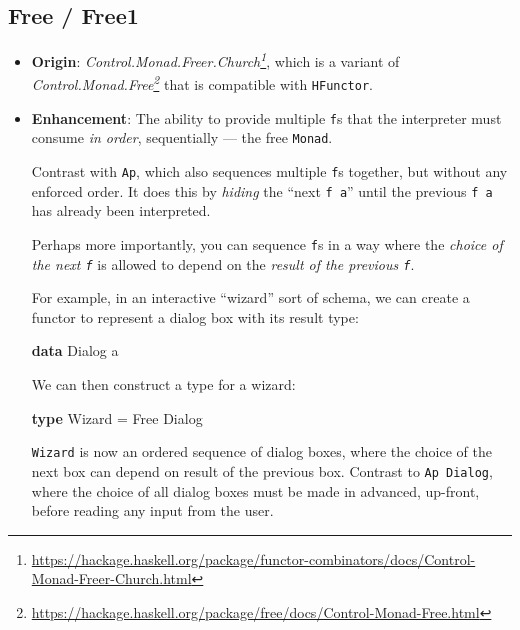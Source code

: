 \documentclass[]{article}
\newenvironment{Shaded}{}{}
\newcommand{\DataTypeTok}[1]{\textcolor[rgb]{0.56,0.13,0.00}{#1}}
\newcommand{\KeywordTok}[1]{\textcolor[rgb]{0.00,0.44,0.13}{\textbf{#1}}}
\newcommand{\NormalTok}[1]{#1}
\newcommand{\OtherTok}[1]{\textcolor[rgb]{0.00,0.44,0.13}{#1}}
\renewcommand{\href}[2]{#2\footnote{\url{#1}}}
\begin{document}
\subsection{Free / Free1}\label{free-free1}

\begin{itemize}
\item
  \textbf{Origin}:
  \emph{\href{https://hackage.haskell.org/package/functor-combinators/docs/Control-Monad-Freer-Church.html}{Control.Monad.Freer.Church}},
  which is a variant of
  \emph{\href{https://hackage.haskell.org/package/free/docs/Control-Monad-Free.html}{Control.Monad.Free}}
  that is compatible with \texttt{HFunctor}.
\item
  \textbf{Enhancement}: The ability to provide multiple \texttt{f}s that the
  interpreter must consume \emph{in order}, sequentially --- the free
  \texttt{Monad}.

  Contrast with \texttt{Ap}, which also sequences multiple \texttt{f}s together,
  but without any enforced order. It does this by \emph{hiding} the ``next
  \texttt{f\ a}'' until the previous \texttt{f\ a} has already been interpreted.

  Perhaps more importantly, you can sequence \texttt{f}s in a way where the
  \emph{choice of the next \texttt{f}} is allowed to depend on the \emph{result
  of the previous \texttt{f}}.

  For example, in an interactive ``wizard'' sort of schema, we can create a
  functor to represent a dialog box with its result type:

\begin{Shaded}
\begin{Highlighting}[]
\KeywordTok{data} \DataTypeTok{Dialog}\NormalTok{ a}
\end{Highlighting}
\end{Shaded}

  We can then construct a type for a wizard:

\begin{Shaded}
\begin{Highlighting}[]
\KeywordTok{type} \DataTypeTok{Wizard} \OtherTok{=} \DataTypeTok{Free} \DataTypeTok{Dialog}
\end{Highlighting}
\end{Shaded}

  \texttt{Wizard} is now an ordered sequence of dialog boxes, where the choice
  of the next box can depend on result of the previous box. Contrast to
  \texttt{Ap\ Dialog}, where the choice of all dialog boxes must be made in
  advanced, up-front, before reading any input from the user.


\end{itemize}
\end{document}
